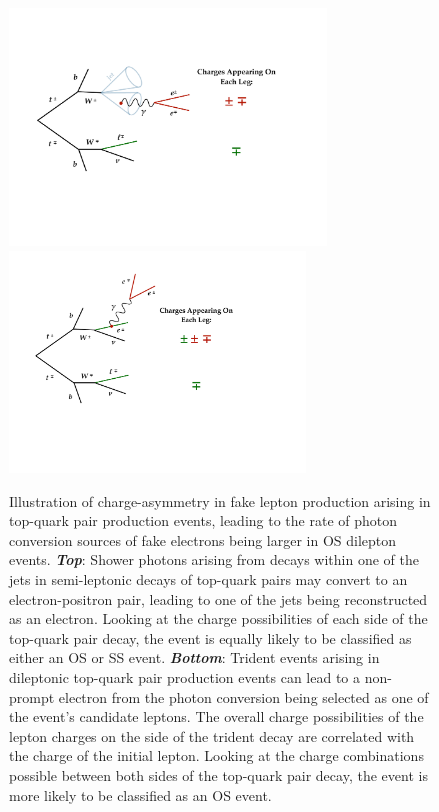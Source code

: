 \begin{figure}[!htb]
    \begin{center}
        \includegraphics[width=0.75\textwidth]{figures/common_ana/fakes/ttbar_fake_charge_sym_semi}
        \includegraphics[width=0.7\textwidth]{figures/common_ana/fakes/ttbar_fake_charge_sym_trident}
        \caption{
            Illustration of charge-asymmetry in fake lepton production
            arising in top-quark pair production events, leading to
            the rate of photon conversion sources of fake electrons being larger in OS dilepton events.
            \textbf{\textit{Top}}: Shower photons arising from decays within one of the jets
                in semi-leptonic decays of top-quark pairs may convert to an electron-positron pair,
                leading to one of the jets being reconstructed as an electron.
                Looking at the charge possibilities of each side of the top-quark pair decay,
                the event is equally likely to be classified as either an OS or SS event.
            \textbf{\textit{Bottom}}: Trident events arising in dileptonic top-quark pair production
                events can lead to a non-prompt electron from the photon conversion being selected
                as one of the event's candidate leptons.
                The overall charge possibilities of the lepton charges on the side of the trident decay
                are correlated with the charge of the initial lepton.
                Looking at the charge combinations possible between both sides of the top-quark pair decay,
                the event is more likely to be classified as an OS event.
        }
        \label{fig:ttbar_fake_charge_sym}
    \end{center}
\end{figure}

